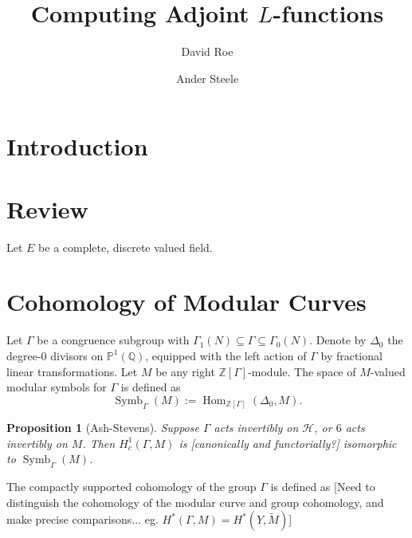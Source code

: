 \documentclass[10pt]{amsart}
\title{Computing Adjoint $L$-functions}
\author{David Roe}
\author{Ander Steele}
\theoremstyle{plain}
\newtheorem{proposition}[theorem]{Proposition}
\theoremstyle{definition}
\newcommand{\ZZ}{{\mathbb{Z}}}
\newcommand{\QQ}{{\mathbb{Q}}}
\newcommand{\cH}{\mathcal{H}}
\DeclareMathOperator{\Hom}{Hom}
\DeclareMathOperator{\Symb}{Symb}
\DeclareMathOperator{\BSymb}{BSymb}
\begin{document}
\maketitle

\section{Introduction}

\section{Review}

Let $E$ be a complete, discrete valued field.  

\section{Cohomology of Modular Curves} \label{sec:mod_curve_cohom}

Let $\Gamma$ be a congruence subgroup with $\Gamma_1(N) \subseteq \Gamma \subseteq \Gamma_0(N)$. Denote by $\Delta_0$ the degree-$0$ divisors on $\mathbb{P}^1(\QQ)$, equipped with the left action of $\Gamma$ by fractional linear transformations. Let $M$ be any right $\ZZ[\Gamma]$-module. The space of $M$-valued modular symbols for $\Gamma$ is defined as
\begin{equation}
	\Symb_\Gamma(M) := \Hom_{\ZZ[\Gamma]}(\Delta_0, M).
\end{equation}

\begin{proposition}[Ash-Stevens]
Suppose $\Gamma$ acts invertibly on $\cH$, or $6$ acts invertibly on $M$. Then $H^1_c(\Gamma,M)$ is [canonically and functorially?] isomorphic to $\Symb_\Gamma(M)$.
\end{proposition}

The compactly supported cohomology of the group $\Gamma$ is defined as 
[Need to distinguish the cohomology of the modular curve and group cohomology, and make precise comparisons... eg. $H^*(\Gamma, M) = H^*(Y, \widetilde{M})$]
\end{document}
